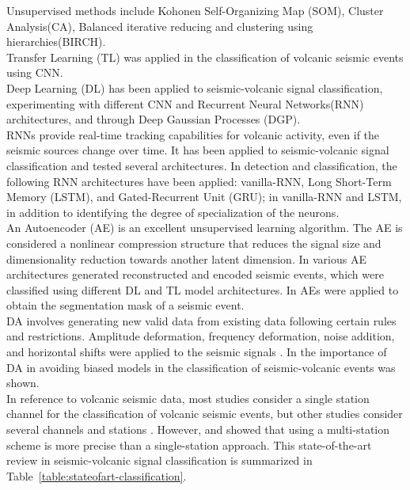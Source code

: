 \documentclass[lettersize,journal]{IEEEtran}
\begin{document}
Unsupervised methods include Kohonen Self-Organizing Map (SOM)\cite{langer2009synopsis,esposito2008unsupervised}, Cluster Analysis(CA)\cite{langer2009synopsis}, Balanced iterative reducing and clustering using hierarchies(BIRCH)\cite{duque2020exploring}. \\
Transfer Learning (TL) was applied in the classification of volcanic seismic events using CNN\cite{mythesismaster,titos2019classification}. \\
Deep Learning (DL) has been applied to seismic-volcanic signal classification, experimenting with different CNN\cite{mythesismaster} and Recurrent Neural Networks(RNN) architectures\cite{salazar2020deep,ferreira2023deep,canario2020indepth}, and through Deep Gaussian Processes (DGP)\cite{lopez2020acontribution}. \\
RNNs provide real-time tracking capabilities for volcanic activity, even if the seismic sources change over time. It has been applied to seismic-volcanic signal classification and tested several architectures\cite{salazar2020deep}. In detection and classification, the following RNN architectures have been applied: vanilla-RNN, Long Short-Term Memory (LSTM), and Gated-Recurrent Unit (GRU)\cite{titos2018detection}; in \cite{rodriguez2021bayesian} vanilla-RNN and LSTM, in addition to identifying the degree of specialization of the neurons. \\
An Autoencoder (AE) is an excellent unsupervised learning algorithm. The AE is considered a nonlinear compression structure that reduces the signal size and dimensionality reduction towards another latent dimension. In \cite{mythesismaster} various AE architectures generated reconstructed and encoded seismic events, which were classified using different DL and TL model architectures. In \cite{rodriguez2021bayesian} AEs were applied to obtain the segmentation mask of a seismic event. \\
DA involves generating new valid data from existing data following certain rules and restrictions. Amplitude deformation, frequency deformation, noise addition, and horizontal shifts were applied to the seismic signals \cite{curilem2018using}. In \cite{salazar2022multi} the importance of DA in avoiding biased models in the classification of seismic-volcanic events was shown. \\
In reference to volcanic seismic data, most studies consider a single station channel for the classification of volcanic seismic events, but other studies consider several channels and stations \cite{lara2020automatic,curilem2016pattern,maggi2017implementation,ferreira2023deep}. However, \cite{titos2019classification} and \cite{ferreira2023deep} showed that using a multi-station scheme is more precise than a single-station approach. This state-of-the-art review in seismic-volcanic signal classification is summarized in Table~\ref{table:stateofart-classification}.
\end{document}

